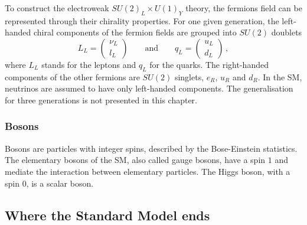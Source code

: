 To construct the electroweak $SU(2)_L \times U(1)_Y$ theory, the fermions field can be represented through their chirality properties.
For one given generation, the left-handed chiral components of the fermion fields are grouped into $SU(2)$ doublets
\begin{equation}
  L_{L}=
  \begin{pmatrix}
    \nu_{L} \\
    l_{L}
  \end{pmatrix}
  \qquad \text{and} \qquad
  q_{L}=
 \begin{pmatrix}
    u_{L} \\
    d_{L}
 \end{pmatrix}
 \,,
 \label{eq:fermion_doublet}
\end{equation}
where $L_L$ stands for the leptons and $q_L$ for the quarks.
The right-handed components of the other fermions are $SU(2)$ singlets, $e_R$, $u_R$ and $d_R$.
In the SM, neutrinos are assumed to have only left-handed components.
The generalisation for three generations is not presented in this chapter.

\subsubsection*{Bosons}

Bosons are particles with integer spins, described by the Bose-Einstein statistics.
The elementary bosons of the SM, also called gauge bosons, have a spin $1$ and mediate the interaction between elementary particles.
The Higgs boson, with a spin $0$, is a scalar boson.

\subsection{Where the Standard Model ends}


